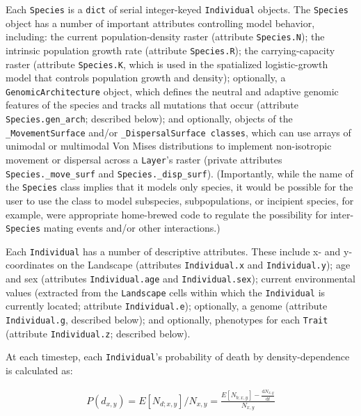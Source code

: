 ﻿\documentclass{article}
\begin{document}
Each \texttt{Species} is a \texttt{dict} of serial integer-keyed \texttt{Individual}
objects.
The \texttt{Species} object has a number of important attributes controlling
model behavior, including: the current population-density raster
(attribute \texttt{Species.N});
the intrinsic population growth rate (attribute \texttt{Species.R});
the carrying-capacity raster (attribute \texttt{Species.K}, which is used in
the spatialized logistic-growth model that controls population growth and density); 
optionally, a \texttt{GenomicArchitecture} object, which defines the
neutral and adaptive genomic features of the species and tracks all mutations that occur
(attribute \texttt{Species.gen\_arch}; described below);
and optionally, objects of the \texttt{\_MovementSurface} and/or
\texttt{\_DispersalSurface classes}, which can use arrays of unimodal or multimodal
Von Mises distributions to implement non-isotropic movement or dispersal across a
\texttt{Layer}'s raster (private attributes \texttt{Species.\_move\_surf} and
\texttt{Species.\_disp\_surf}).
(Importantly, while the name of the \texttt{Species} class implies that
it models only species, it would be possible for the user to use the class to model
subspecies, subpopulations, or incipient species, for example, were appropriate
home-brewed code to regulate the possibility for inter-\texttt{Species} mating events
and/or other interactions.)

Each \texttt{Individual} has a number of descriptive attributes. These include
x- and y-coordinates on the Landscape (attributes \texttt{Individual.x}
and \texttt{Individual.y}); age and sex (attributes \texttt{Individual.age} and
\texttt{Individual.sex}); current environmental values (extracted from the
\texttt{Landscape} cells within which the \texttt{Individual} is currently located;
attribute \texttt{Individual.e}); optionally, a genome (attribute
\texttt{Individual.g}, described below); and optionally, phenotypes for each
\texttt{Trait} (attribute \texttt{Individual.z}; described below).

At each timestep, each \texttt{Individual}'s probability of death by density-dependence
is calculated as:

\begin{equation}
\begin{split}
       P(d_{x,y}) = E[N_{d;x,y}]/N_{x,y} = \frac{E[N_{b;x,y}] - \frac{\mathrm{d}N_{x,y}}{\mathrm{d}t}}{N_{x,y}}
\end{split}
\end{equation}
\end{document}
